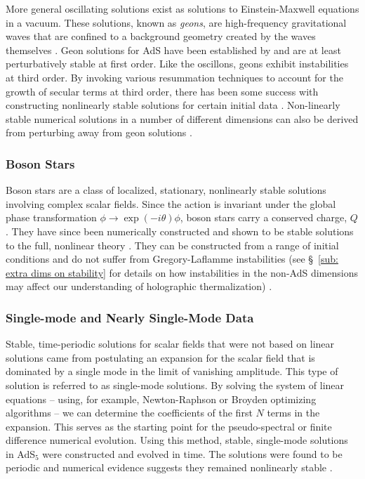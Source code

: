 \documentclass[../PhD.tex]{subfiles}
\begin{document}
More general oscillating solutions exist as solutions to Einstein-Maxwell equations in a vacuum. These solutions, known as \emph{geons}, are high-frequency gravitational waves that are confined to a background geometry created by the waves themselves \cite{Wheeler:1955zz}. Geon solutions for AdS have been established by \cite{1109.1825} and are at least perturbatively stable at first order. Like the oscillons, geons exhibit instabilities at third order. By invoking various resummation techniques to account for the growth of secular terms at third order, there has been some success with constructing nonlinearly stable solutions for certain initial data \cite{1408.5906, 1701.07804}. Non-linearly stable numerical solutions in a number of different dimensions can also be derived from perturbing away from geon solutions \cite{1503.07746}.

\subsubsection{Boson Stars}

Boson stars are a class of localized, stationary, nonlinearly stable solutions involving complex scalar fields. Since the \ads action is invariant under the global phase transformation $\phi \to \exp(-i \theta) \phi$, boson stars carry a conserved charge, $Q$. They have since been numerically constructed and shown to be stable solutions to the full, nonlinear theory \cite{1304.4166}. They can be constructed from a range of initial conditions \cite{1209.2378, 1301.2452} and do not suffer from Gregory-Laflamme instabilities (see \S~\ref{sub: extra dims on stability} for details on how instabilities in the non-AdS dimensions may affect our understanding of holographic thermalization) \cite{1509.00774}. 

\subsubsection{Single-mode and Nearly Single-Mode Data}

Stable, time-periodic solutions for scalar fields that were not based on linear solutions came from postulating an expansion for the scalar field that is dominated by a single mode in the limit of vanishing amplitude. This type of solution is referred to as single-mode solutions. By solving the system of linear equations -- using, for example, Newton-Raphson or Broyden optimizing algorithms -- we can determine the coefficients of the first $N$ terms in the expansion. This serves as the starting point for the pseudo-spectral or finite difference numerical evolution. Using this method, stable, single-mode solutions in AdS$_5$ were constructed and evolved in time. The solutions were found to be periodic and numerical evidence suggests they remained nonlinearly stable \cite{1303.3186}.
\end{document}
